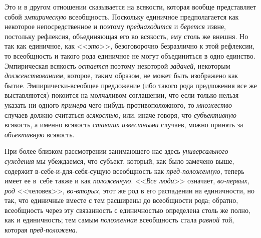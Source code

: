 \label{bkm:bm38a}Это и в другом отношении сказывается на всякости, которая
вообще представляет собой {\em эмпирическую} всеобщность. Поскольку единичное
предполагается как некоторое непосредственное и поэтому {\em преднаходится} и
{\em берется} извне, постольку рефлексия, объединяющая его во всякость, ему
столь же внешня. Но так как единичное, как <<{\em это}>>, безоговорочно
безразлично к этой рефлексии, то всеобщность и такого рода единичное не могут
объединиться в одно единство. Эмпирическая всякость {\em остается} поэтому
некоторой {\em задачей}, некоторым {\em долженствованием}, которое, таким
образом, не может быть изображено как бытие. Эмпирически-всеобщее предложение
(ибо такого рода предложения все же выставляются) покоится на молчаливом
соглашении, что если только нельзя указать ни одного {\em примера} чего-нибудь
противоположного, то {\em множество} случаев должно считаться {\em всякостью;}
или, иначе говоря, что {\em субъективную} всякость, а именно всякость
{\em ставших известными} случаев, можно принять за {\em объективную} всякость.

При более близком рассмотрении занимающего нас здесь {\em универсального
суждения} мы убеждаемся, что субъект, который, как было замечено выше, содержит
в-себе-и-для-себя-сущую всеобщность как {\em пред-положенную}, теперь имеет ее
в~себе также и как {\em положенную}. <<{\em Все люди}>> означает,
{\em во-первых, род} <<человек>>, {\em во-вторых}, этот же род в его
распадении на единичности, но так, что единичные вместе с тем расширены до
всеобщности рода; обратно, всеобщность через эту связанность с единичностью
определена столь же полно, как и единичность; тем самым {\em положенная}
всеобщность стала {\em равной} той, которая {\em пред-положена}.

